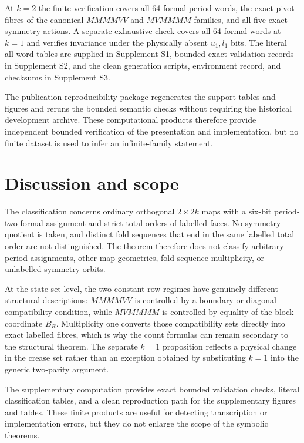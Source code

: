 \documentclass[11pt]{article}
\theoremstyle{definition}
\theoremstyle{remark}
\begin{document}
At $k=2$ the finite verification covers all 64 formal period words, the exact pivot fibres of the canonical $MMMMVV$ and $MVMMMM$ families, and all five exact symmetry actions. A separate exhaustive check covers all 64 formal words at $k=1$ and verifies invariance under the physically absent $u_1,l_1$ bits. The literal all-word tables are supplied in Supplement S1, bounded exact validation records in Supplement S2, and the clean generation scripts, environment record, and checksums in Supplement S3.

The publication reproducibility package regenerates the support tables and figures and reruns the bounded semantic checks without requiring the historical development archive. These computational products therefore provide independent bounded verification of the presentation and implementation, but no finite dataset is used to infer an infinite-family statement.

\section{Discussion and scope}
The classification concerns ordinary orthogonal $2\times2k$ maps with a six-bit period-two formal assignment and strict total orders of labelled faces. No symmetry quotient is taken, and distinct fold sequences that end in the same labelled total order are not distinguished. The theorem therefore does not classify arbitrary-period assignments, other map geometries, fold-sequence multiplicity, or unlabelled symmetry orbits.

At the state-set level, the two constant-row regimes have genuinely different structural descriptions: $MMMMVV$ is controlled by a boundary-or-diagonal compatibility condition, while $MVMMMM$ is controlled by equality of the block coordinate $B_R$. Multiplicity one converts those compatibility sets directly into exact labelled fibres, which is why the count formulas can remain secondary to the structural theorem. The separate $k=1$ proposition reflects a physical change in the crease set rather than an exception obtained by substituting $k=1$ into the generic two-parity argument.

The supplementary computation provides exact bounded validation checks, literal classification tables, and a clean reproduction path for the supplementary figures and tables. These finite products are useful for detecting transcription or implementation errors, but they do not enlarge the scope of the symbolic theorems.
\end{document}
